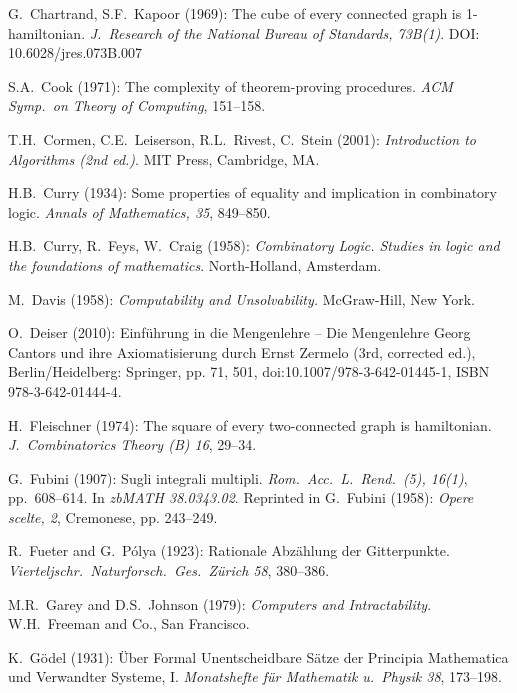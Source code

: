 \begin{thebibliography}{999}
G.~Chartrand, S.F.~Kapoor (1969):
The cube of every connected graph is 1-hamiltonian.
{\it J.~Research of the National Bureau of Standards, 73B(1)}.  DOI:
10.6028/jres.073B.007

S.A.~Cook (1971): The complexity of theorem-proving procedures.  {\it
  ACM Symp.~on Theory of Computing}, 151--158.

T.H.~Cormen, C.E.~Leiserson, R.L.~Rivest, C.~Stein (2001):
{\it Introduction to Algorithms (2nd ed.)}.
MIT Press, Cambridge, MA.

H.B.~Curry (1934): Some properties of equality and implication in
combinatory logic.  {\it Annals of Mathematics, 35}, 849--850.

H.B.~Curry, R.~Feys, W.~Craig (1958):
{\it Combinatory Logic.  Studies in logic and the foundations of
mathematics}.  North-Holland, Amsterdam.


M.~Davis (1958):
{\it Computability and Unsolvability.}
McGraw-Hill, New York.

O.~Deiser (2010): Einf\"{u}hrung in die Mengenlehre – Die Mengenlehre
Georg Cantors und ihre Axiomatisierung durch Ernst Zermelo (3rd,
corrected ed.), Berlin/Heidelberg: Springer, pp. 71, 501,
doi:10.1007/978-3-642-01445-1, ISBN 978-3-642-01444-4.



H.~Fleischner (1974):
The square of every two-connected graph is hamiltonian.
{\it J.~Combinatorics Theory (B) 16}, 29--34.

G.~Fubini (1907): Sugli integrali multipli.
{\it Rom.~Acc.~L.~Rend.~(5), 16(1)}, pp.~608–614.  In {\it zbMATH
  38.0343.02}.  Reprinted in
G.~Fubini (1958): {\it Opere scelte, 2}, Cremonese, pp. 243–249.

R.~Fueter and G.~P\'{o}lya (1923):
Rationale Abz\"{a}hlung der Gitterpunkte.  {\it
Vierteljschr.~Naturforsch.~Ges.~Z\"{u}rich 58}, 380--386.


M.R.~Garey and D.S.~Johnson (1979):
{\it Computers and Intractability}.
W.H.~Freeman and Co., San Francisco.

K.~G\"{o}del (1931): \"{U}ber Formal Unentscheidbare S\"{a}tze der
Principia Mathematica und Verwandter Systeme, I.  {\it Monatshefte
f\"{u}r Mathematik u.~Physik 38}, 173--198.



\end{thebibliography}
